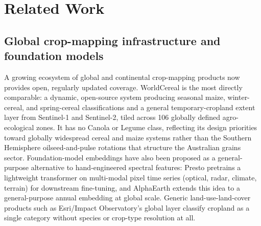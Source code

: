 
\section{Related Work}\label{related-work}

\subsection{Global crop-mapping infrastructure and foundation models}\label{global-crop-mapping-infrastructure-and-foundation-models}

A growing ecosystem of global and continental crop-mapping products now provides open, regularly updated coverage. WorldCereal \citep{vantricht2023worldcereal} is the most directly comparable: a dynamic, open-source system producing seasonal maize, winter-cereal, and spring-cereal classifications and a general temporary-cropland extent layer from Sentinel-1 and Sentinel-2, tiled across 106 globally defined agro-ecological zones. It has no Canola or Legume class, reflecting its design priorities toward globally widespread cereal and maize systems rather than the Southern Hemisphere oilseed-and-pulse rotations that structure the Australian grains sector. Foundation-model embeddings have also been proposed as a general-purpose alternative to hand-engineered spectral features: Presto \citep{tseng2024presto} pretrains a lightweight transformer on multi-modal pixel time series (optical, radar, climate, terrain) for downstream fine-tuning, and AlphaEarth \citep{brown2025alphaearth} extends this idea to a general-purpose annual embedding at global scale. Generic land-use-land-cover products such as Esri/Impact Observatory's global layer \citep{karra2021esri} classify cropland as a single category without species or crop-type resolution at all.

